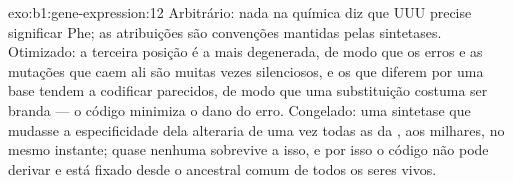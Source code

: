 \begin{solution}{exo:b1:gene-expression:12}
Arbitrário: nada na química diz que UUU precise significar Phe; as
atribuições são convenções mantidas pelas sintetases. Otimizado: a
terceira posição é a mais degenerada, de modo que os erros e as mutações
que caem ali são muitas vezes silenciosos, e os  que diferem por
uma base tendem a codificar  parecidos, de modo que uma
substituição costuma ser branda --- o código minimiza o dano do erro.
Congelado: uma sintetase que mudasse a especificidade dela alteraria de
uma vez todas as  da , aos milhares, no mesmo instante;
quase nenhuma  sobrevive a isso, e por isso o código não pode
derivar e está fixado desde o ancestral comum de todos os seres vivos.
\end{solution}

